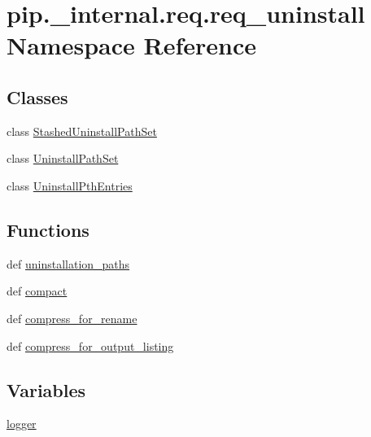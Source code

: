 \hypertarget{namespacepip_1_1__internal_1_1req_1_1req__uninstall}{}\section{pip.\+\_\+internal.\+req.\+req\+\_\+uninstall Namespace Reference}
\label{namespacepip_1_1__internal_1_1req_1_1req__uninstall}
\subsection*{Classes}
\begin{DoxyCompactItemize}
\item 
class \hyperlink{classpip_1_1__internal_1_1req_1_1req__uninstall_1_1StashedUninstallPathSet}{Stashed\+Uninstall\+Path\+Set}
\item 
class \hyperlink{classpip_1_1__internal_1_1req_1_1req__uninstall_1_1UninstallPathSet}{Uninstall\+Path\+Set}
\item 
class \hyperlink{classpip_1_1__internal_1_1req_1_1req__uninstall_1_1UninstallPthEntries}{Uninstall\+Pth\+Entries}
\end{DoxyCompactItemize}
\subsection*{Functions}
\begin{DoxyCompactItemize}
\item 
def \hyperlink{namespacepip_1_1__internal_1_1req_1_1req__uninstall_a49e8602c81a09fc6f3ad44f36bdc1eb6}{uninstallation\+\_\+paths}
\item 
def \hyperlink{namespacepip_1_1__internal_1_1req_1_1req__uninstall_a17a2b8b0cb3583f87565a04668fcb513}{compact}
\item 
def \hyperlink{namespacepip_1_1__internal_1_1req_1_1req__uninstall_ab6d89a05226477224fed32f07b7c8d85}{compress\+\_\+for\+\_\+rename}
\item 
def \hyperlink{namespacepip_1_1__internal_1_1req_1_1req__uninstall_a59296a78e6030aee310c06a4b1330a85}{compress\+\_\+for\+\_\+output\+\_\+listing}
\end{DoxyCompactItemize}
\subsection*{Variables}
\begin{DoxyCompactItemize}
\item 
\hyperlink{namespacepip_1_1__internal_1_1req_1_1req__uninstall_a017517f271cc4ab3f9bd8b440c3f95d2}{logger}
\end{DoxyCompactItemize}


